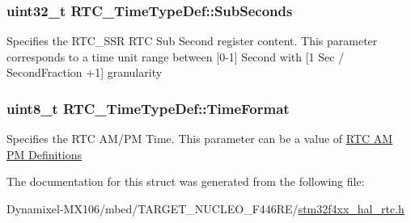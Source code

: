 \subsubsection[{\texorpdfstring{Sub\+Seconds}{SubSeconds}}]{\setlength{\rightskip}{0pt plus 5cm}uint32\+\_\+t R\+T\+C\+\_\+\+Time\+Type\+Def\+::\+Sub\+Seconds}\hypertarget{struct_r_t_c___time_type_def_ae24e60a3b9549fd02b00ad6762ae5b77}{}\label{struct_r_t_c___time_type_def_ae24e60a3b9549fd02b00ad6762ae5b77}
Specifies the R\+T\+C\+\_\+\+S\+SR R\+TC Sub Second register content. This parameter corresponds to a time unit range between \mbox{[}0-\/1\mbox{]} Second with \mbox{[}1 Sec / Second\+Fraction +1\mbox{]} granularity 
\subsubsection[{\texorpdfstring{Time\+Format}{TimeFormat}}]{\setlength{\rightskip}{0pt plus 5cm}uint8\+\_\+t R\+T\+C\+\_\+\+Time\+Type\+Def\+::\+Time\+Format}\hypertarget{struct_r_t_c___time_type_def_a701c21c52472e8caf9e23653ec2fd604}{}\label{struct_r_t_c___time_type_def_a701c21c52472e8caf9e23653ec2fd604}
Specifies the R\+TC A\+M/\+PM Time. This parameter can be a value of \hyperlink{group___r_t_c___a_m___p_m___definitions}{R\+TC AM PM Definitions} 

The documentation for this struct was generated from the following file\+:\begin{DoxyCompactItemize}
\item 
Dynamixel-\/\+M\+X106/mbed/\+T\+A\+R\+G\+E\+T\+\_\+\+N\+U\+C\+L\+E\+O\+\_\+\+F446\+R\+E/\hyperlink{stm32f4xx__hal__rtc_8h}{stm32f4xx\+\_\+hal\+\_\+rtc.\+h}\end{DoxyCompactItemize}
